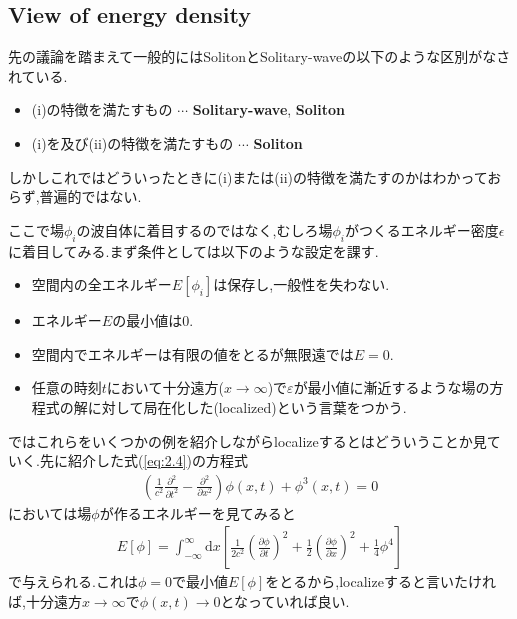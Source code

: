 \documentclass[dvipdfmx,11pt,a4paper,oneside,openany]{jsbook}
\begin{document}
\subsection{View of energy density}
先の議論を踏まえて一般的にはSolitonとSolitary-waveの以下のような区別がなされている.
\begin{screen}
    \begin{itemize}
        \item (i)の特徴を満たすもの $\cdots$ {\bf Solitary-wave}, {\bf Soliton}
        \item (i)を及び(ii)の特徴を満たすもの $\cdots$ {\bf Soliton}
    \end{itemize}
\end{screen}

しかしこれではどういったときに(i)または(ii)の特徴を満たすのかはわかっておらず,普遍的ではない.

ここで場$\phi_i$の波自体に着目するのではなく,むしろ場$\phi_i$がつくるエネルギー密度$\epsilon$に着目してみる.まず条件としては以下のような設定を課す.
\begin{itemize}
    \item 空間内の全エネルギー$E[\phi_i]$は保存し,一般性を失わない.
    \item エネルギー$E$の最小値は0.
    \item 空間内でエネルギーは有限の値をとるが無限遠では$E=0$.
    \item 任意の時刻$t$において十分遠方($x\rightarrow \infty$)で$\varepsilon$が最小値に漸近するような場の方程式の解に対して局在化した(localized)という言葉をつかう.
\end{itemize}
ではこれらをいくつかの例を紹介しながらlocalizeするとはどういうことか見ていく.先に紹介した式(\ref{eq:2.4})の方程式
\begin{align*}
    \left(\frac{1}{c^{2}} \frac{\partial^{2}}{\partial t^{2}}-\frac{\partial^{2}}{\partial x^{2}}\right) \phi(x, t)+\phi^{3}(x, t)=0
\end{align*}
においては場$\phi$が作るエネルギーを見てみると
\begin{align}
    E[\phi]=\int_{-\infty}^{\infty} \mathrm{d} x\left[\frac{1}{2 c^{2}}\left(\frac{\partial \phi}{\partial t}\right)^{2}+\frac{1}{2}\left(\frac{\partial \phi}{\partial x}\right)^{2}+\frac{1}{4} \phi^{4}\right]
\end{align}
で与えられる.これは$\phi=0$で最小値$E[\phi]$をとるから,localizeすると言いたければ,十分遠方$x\rightarrow \infty$で$\phi(x,t)\rightarrow 0$となっていれば良い.\\
\end{document}
